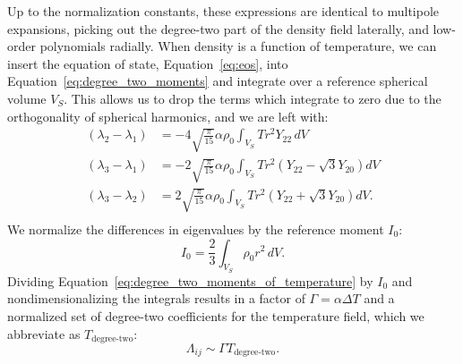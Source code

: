 \documentclass[preprint,12pt,authoryear]{elsarticle}
\begin{document}
Up to the normalization constants, these expressions are identical to multipole expansions, 
picking out the degree-two part of the density field laterally, and low-order polynomials radially.
When density is a function of temperature, we can insert the equation of state, Equation~\eqref{eq:eos}, into 
Equation~\eqref{eq:degree_two_moments} and integrate over a reference spherical volume $V_S$.
This allows us to drop the terms which integrate to zero due to the orthogonality of spherical harmonics, and we are left with:
\begin{equation}
\begin{aligned}
(\lambda_2 - \lambda_1) &= -4 \sqrt{\frac{\pi}{15} } \alpha \rho_0 \int_{V_S} T r^2  Y_{22} \,dV \\
(\lambda_3 - \lambda_1) &= -2 \sqrt{ \frac{\pi}{15} } \alpha \rho_0 \int_{V_S} T r^2 \left( Y_{22} - \sqrt{3} Y_{20} \right) dV \\
(\lambda_3 - \lambda_2) &= 2 \sqrt{ \frac{\pi}{15} } \alpha \rho_0 \int_{V_S}  T r^2 \left( Y_{22} + \sqrt{3} Y_{20} \right) dV. \\
\label{eq:degree_two_moments_of_temperature}
\end{aligned}
\end{equation}
We normalize the differences in eigenvalues by the reference moment $I_0$:
\begin{equation}
I_0 = \frac{2}{3} \int_{V_S} \rho_0 r^2 \,dV.
\end{equation}
Dividing Equation~\eqref{eq:degree_two_moments_of_temperature} by $I_0$ and nondimensionalizing 
the integrals results in a factor of $\Gamma = \alpha \Delta T$ and a normalized set of 
degree-two coefficients for the temperature field, which we abbreviate as $T_{\text{degree-two}}$:
\begin{equation}
\Lambda_{ij} \sim \Gamma T_{\text{degree-two}}.
\end{equation}
\end{document}

